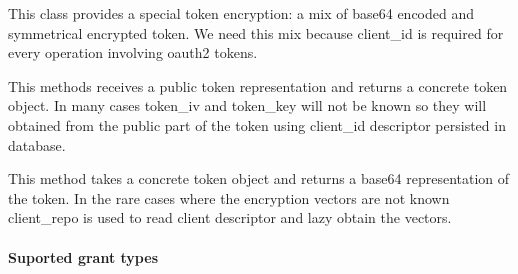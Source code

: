 \documentclass[letterpaper,10pt,english]{sphinxmanual}
\begin{document}
\begin{fulllineitems}
\label{features/oauth2/technical_summary:fantastico.oauth2.token_encryption.PublicTokenEncryption}
This class provides a special token encryption: a mix of base64 encoded and symmetrical encrypted token. We need
this mix because client\_id is required for every operation involving oauth2 tokens.

\begin{fulllineitems}
\label{features/oauth2/technical_summary:fantastico.oauth2.token_encryption.PublicTokenEncryption.decrypt_token}
This methods receives a public token representation and returns a concrete token object. In many cases token\_iv and
token\_key will not be known so they will obtained from the public part of the token using client\_id descriptor
persisted in database.

\end{fulllineitems}


\begin{fulllineitems}
\label{features/oauth2/technical_summary:fantastico.oauth2.token_encryption.PublicTokenEncryption.encrypt_token}
This method takes a concrete token object and returns a base64 representation of the token. In the rare cases where
the encryption vectors are not known client\_repo is used to read client descriptor and lazy obtain the vectors.

\end{fulllineitems}


\end{fulllineitems}



\paragraph{Suported grant types}
\label{features/oauth2/technical_summary:suported-grant-types}
\end{document}
